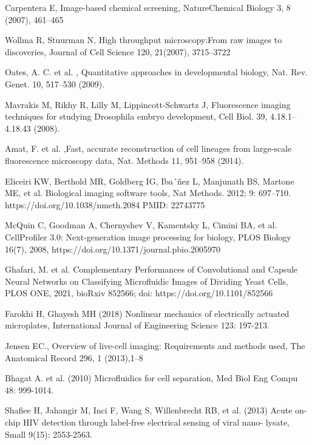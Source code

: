 \documentclass[conference]{IEEEtran}
\begin{document}
\begin{thebibliography}{00}


Carpentera E,  Image-based chemical screening, NatureChemical Biology 3, 8 (2007), 461–465

Wollma R, Stuurman N,  High throughput microscopy:From raw images to discoveries, Journal of Cell Science 120, 21(2007), 3715–3722

Oates, A. C. et al. , Quantitative approaches in developmental biology, Nat. Rev. Genet. 10, 517–530 (2009).

Mavrakis M, Rikhy R, Lilly M, Lippincott-Schwartz J, Fluorescence imaging techniques for studying Drosophila embryo development, Cell Biol. 39, 4.18.1–4.18.43 (2008).

Amat, F. et al. ,Fast, accurate reconstruction of cell lineages from large-scale fluorescence microscopy data, Nat. Methods 11, 951–958 (2014).

Eliceiri KW, Berthold MR, Goldberg IG, Iba´ñez L, Manjunath BS, Martone ME, et al. Biological imaging software tools, Nat Methods. 2012; 9: 697–710. https://doi.org/10.1038/nmeth.2084 PMID: 22743775

McQuin C, Goodman A, Chernyshev V, Kamentsky L, Cimini BA, et al. CellProfiler 3.0: Next-generation image processing for biology, PLOS Biology 16(7), 2008, https://doi.org/10.1371/journal.pbio.2005970

Ghafari, M. et al. Complementary Performances of Convolutional and Capsule Neural Networks on Classifying Microfluidic Images of Dividing Yeast Cells, PLOS ONE, 2021, bioRxiv 852566; doi: https://doi.org/10.1101/852566

Farokhi H, Ghayesh MH (2018) Nonlinear mechanics of electrically actuated microplates, International Journal of Engineering Science 123: 197-213.

Jensen EC., Overview of live-cell imaging: Requirements and methods used, The Anatomical Record 296, 1 (2013),1–8


 Bhagat A. et al. (2010) Microfluidics for cell separation, Med Biol Eng Compu 48: 999-1014.

Shafiee H, Jahangir M, Inci F, Wang S, Willenbrecht RB, et al. (2013) Acute on-chip HIV detection through label-free electrical sensing of viral nano- lysate, Small 9(15): 2553-2563.


\end{thebibliography}
\end{document}
